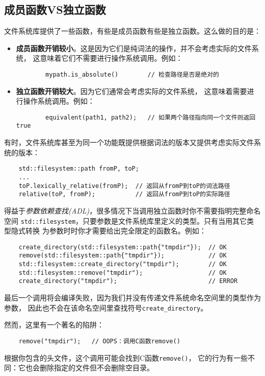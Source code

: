 \subsection{成员函数VS独立函数}
文件系统库提供了一些函数，有些是成员函数有些是独立函数。这么做的目的是：
\begin{itemize}
    \item \textbf{成员函数开销较小}。这是因为它们是纯词法的操作，并不会考虑实际的文件系统，
    这意味着它们不需要进行操作系统调用。例如：
    \begin{lstlisting}
        mypath.is_absolute()        // 检查路径是否是绝对的
    \end{lstlisting}
    \item \textbf{独立函数开销较大}。因为它们通常会考虑实际的文件系统，
    这意味着需要进行操作系统调用。例如：
    \begin{lstlisting}
        equivalent(path1, path2);   // 如果两个路径指向同一个文件则返回true
    \end{lstlisting}
\end{itemize}
有时，文件系统库甚至为同一个功能既提供根据词法的版本又提供考虑实际文件系统的版本：
\begin{lstlisting}
    std::filesystem::path fromP, toP;
    ...
    toP.lexically_relative(fromP);  // 返回从fromP到toP的词法路径
    relative(toP, fromP);           // 返回从fromP到toP的实际路径
\end{lstlisting}
得益于\emph{参数依赖查找(ADL)}，很多情况下当调用独立函数时你不需要指明完整命名空间
\texttt{std::filesystem}，只要参数是文件系统库里定义的类型。只有当用其它类型隐式转换
为参数时时你才需要给出完全限定的函数名。例如：\label{ADL导致意外行为}
\begin{lstlisting}
    create_directory(std::filesystem::path{"tmpdir"});  // OK
    remove(std::filesystem::path{"tmpdir"});            // OK
    std::filesystem::create_directory("tmpdir");        // OK
    std::filesystem::remove("tmpdir");                  // OK
    create_directory("tmpdir");                         // ERROR
\end{lstlisting}
最后一个调用将会编译失败，因为我们并没有传递文件系统命名空间里的类型作为参数，
因此也不会在该命名空间里查找符号\texttt{create\_directory}。

然而，这里有一个著名的陷阱：
\begin{lstlisting}
    remove("tmpdir");   // OOPS：调用C函数remove()
\end{lstlisting}
根据你包含的头文件，这个调用可能会找到C函数\texttt{remove()}，
它的行为有一些不同：它也会删除指定的文件但不会删除空目录。

